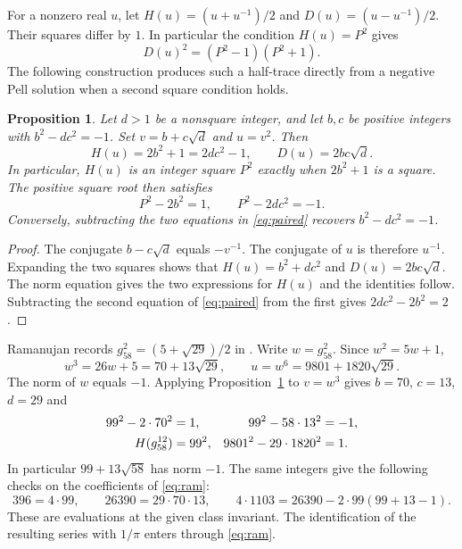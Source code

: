 \documentclass[11pt,reqno]{amsart}
\newtheorem{proposition}[theorem]{Proposition}
\begin{document}
For a nonzero real $u$, let $H(u)=(u+u^{-1})/2$ and
$D(u)=(u-u^{-1})/2$. Their squares differ by $1$. In particular the
condition $H(u)=P^2$ gives
\begin{equation}\label{eq:factor}
 D(u)^2=(P^2-1)(P^2+1).
\end{equation}
The following construction produces such a half-trace directly from a
negative Pell solution when a second square condition holds.

\begin{proposition}\label{prop:unit}
Let $d>1$ be a nonsquare integer, and let $b,c$ be positive integers with
$b^2-dc^2=-1$. Set $v=b+c\sqrt d$ and $u=v^2$. Then
\[
 H(u)=2b^2+1=2dc^2-1,\qquad D(u)=2bc\sqrt d .
\]
In particular, $H(u)$ is an integer square $P^2$ exactly when
$2b^2+1$ is a square. The positive square root then satisfies
\begin{equation}\label{eq:paired}
 P^2-2b^2=1,\qquad P^2-2dc^2=-1 .
\end{equation}
Conversely, subtracting the two equations in \eqref{eq:paired}
recovers $b^2-dc^2=-1$.
\end{proposition}

\begin{proof}
The conjugate $b-c\sqrt d$ equals $-v^{-1}$.
The conjugate of $u$ is therefore $u^{-1}$. Expanding the two squares
shows that $H(u)=b^2+dc^2$ and $D(u)=2bc\sqrt d$.
The norm equation gives the two expressions for $H(u)$ and the identities
follow. Subtracting the second equation of \eqref{eq:paired} from the
first gives $2dc^2-2b^2=2$.
\end{proof}

Ramanujan records $g_{58}^2=(5+\sqrt{29})/2$
in \cite[\S\S5--6]{Ramanujan}. Write $w=g_{58}^2$. Since $w^2=5w+1$,
\[
 w^3=26w+5=70+13\sqrt{29},\qquad
 u=w^6=9801+1820\sqrt{29}.
\]
The norm of $w$ equals $-1$. Applying Proposition~\ref{prop:unit}
to $v=w^3$ gives $b=70$, $c=13$, $d=29$ and
\begin{align}
 99^2-2\cdot70^2&=1, &99^2-58\cdot13^2&=-1,\label{eq:Pell99}\\
 H(g_{58}^{12})&=99^2, & 9801^2-29\cdot1820^2&=1.\notag
\end{align}
In particular $99+13\sqrt{58}$ has norm $-1$. The same integers give
the following checks on the coefficients of \eqref{eq:ram}:
\[
 396=4\cdot99,\qquad
 26390=29\cdot70\cdot13,\qquad
 4\cdot1103=26390-2\cdot99(99+13-1).
\]
These are evaluations at the given class invariant. The identification
of the resulting series with $1/\pi$ enters through \eqref{eq:ram}.
\end{document}
